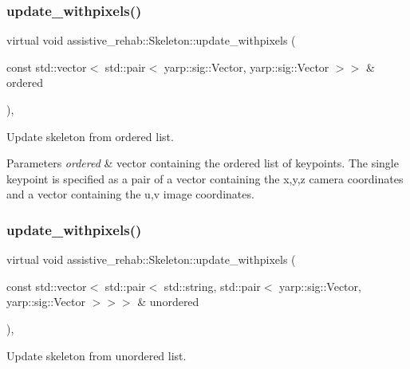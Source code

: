 \subsubsection{\texorpdfstring{update\_withpixels()}{update\_withpixels()}\hspace{0.1cm}{\footnotesize\ttfamily [1/2]}}
{\footnotesize\ttfamily virtual void assistive\+\_\+rehab\+::\+Skeleton\+::update\+\_\+withpixels (\begin{DoxyParamCaption}\item[{const std\+::vector$<$ std\+::pair$<$ yarp\+::sig\+::\+Vector, yarp\+::sig\+::\+Vector $>$$>$ \&}]{ordered }\end{DoxyParamCaption})\hspace{0.3cm}{\ttfamily [virtual]}, {\ttfamily [inherited]}}



Update skeleton from ordered list. 


\begin{DoxyParams}{Parameters}
{\em ordered} & vector containing the ordered list of keypoints. The single keypoint is specified as a pair of a vector containing the x,y,z camera coordinates and a vector containing the u,v image coordinates. \\
\hline
\end{DoxyParams}
\mbox{\label{classassistive__rehab_1_1Skeleton_a36e9dfd4910120025e40ccc3d03c0e01}} 
\subsubsection{\texorpdfstring{update\_withpixels()}{update\_withpixels()}\hspace{0.1cm}{\footnotesize\ttfamily [2/2]}}
{\footnotesize\ttfamily virtual void assistive\+\_\+rehab\+::\+Skeleton\+::update\+\_\+withpixels (\begin{DoxyParamCaption}\item[{const std\+::vector$<$ std\+::pair$<$ std\+::string, std\+::pair$<$ yarp\+::sig\+::\+Vector, yarp\+::sig\+::\+Vector $>$$>$$>$ \&}]{unordered }\end{DoxyParamCaption})\hspace{0.3cm}{\ttfamily [virtual]}, {\ttfamily [inherited]}}



Update skeleton from unordered list. 


